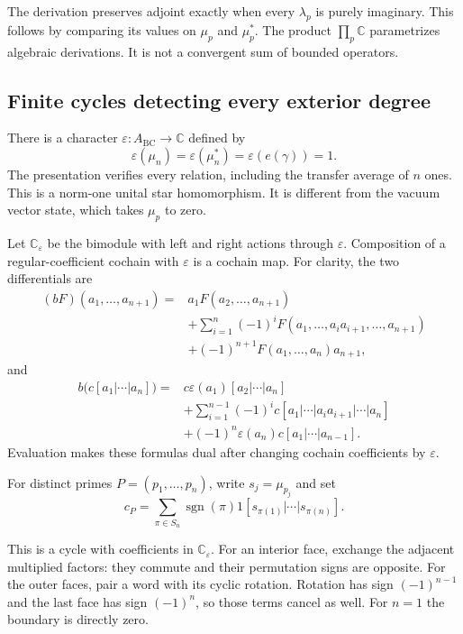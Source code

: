 The derivation preserves adjoint exactly when every $\lambda_p$ is purely
imaginary. This follows by comparing its values on $\mu_p$ and $\mu_p^*$.
The product $\prod_p\mathbb C$ parametrizes algebraic derivations. It is not
a convergent sum of bounded operators.

\subsection{Finite cycles detecting every exterior degree}

There is a character $\varepsilon:A_{\mathrm{BC}}\to\mathbb C$ defined by
\[
 \varepsilon(\mu_n)=\varepsilon(\mu_n^*)
  =\varepsilon(e(\gamma))=1.
\]
The presentation verifies every relation, including the transfer average of
$n$ ones. This is a norm-one unital star homomorphism. It is different from
the vacuum vector state, which takes $\mu_p$ to zero.

Let $\mathbb C_\varepsilon$ be the bimodule with left and right actions
through $\varepsilon$. Composition of a regular-coefficient cochain with
$\varepsilon$ is a cochain map. For clarity, the two differentials are
\begin{align*}
 (bF)(a_1,\ldots,a_{n+1})={}&
    a_1F(a_2,\ldots,a_{n+1})\\
 &+\sum_{i=1}^n(-1)^i
     F(a_1,\ldots,a_ia_{i+1},\ldots,a_{n+1})\\
 &+(-1)^{n+1}F(a_1,\ldots,a_n)a_{n+1},
\end{align*}
and
\begin{align*}
 b\bigl(c[a_1|\cdots|a_n]\bigr)={}&
    c\varepsilon(a_1)[a_2|\cdots|a_n]\\
 &+\sum_{i=1}^{n-1}(-1)^i
       c[a_1|\cdots|a_ia_{i+1}|\cdots|a_n]\\
 &+(-1)^n\varepsilon(a_n)c[a_1|\cdots|a_{n-1}].
\end{align*}
Evaluation makes these formulas dual after changing cochain coefficients by
$\varepsilon$.

For distinct primes $P=(p_1,\ldots,p_n)$, write $s_j=\mu_{p_j}$ and set
\[
 c_P=\sum_{\pi\in S_n}\operatorname{sgn}(\pi)
                 1[s_{\pi(1)}|\cdots|s_{\pi(n)}].
\]

This is a cycle with coefficients in $\mathbb C_\varepsilon$. For an
interior face, exchange the adjacent multiplied factors: they commute and
their permutation signs are opposite. For the outer faces, pair a word with
its cyclic rotation. Rotation has sign $(-1)^{n-1}$ and the last face has
sign $(-1)^n$, so those terms cancel as well. For $n=1$ the boundary is
directly zero.

